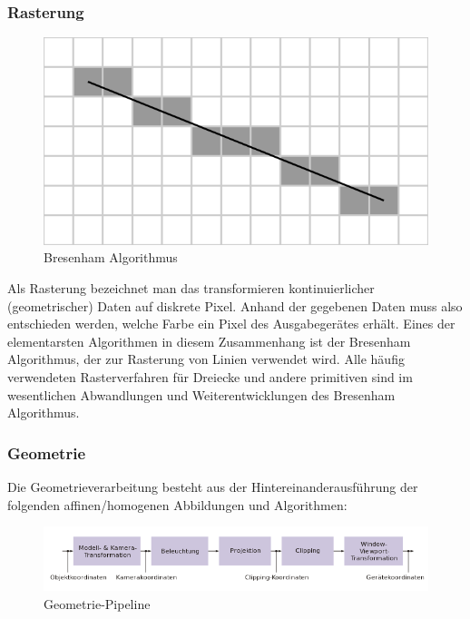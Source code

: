 \subsubsection{Rasterung}
\begin{figure}[H]
    \centering
    \includegraphics[width=1.0\textwidth]{images/bresenham.png}
    \caption{Bresenham Algorithmus}
    \label{fig:gimbal+lock}
\end{figure}
Als Rasterung bezeichnet man das transformieren kontinuierlicher (geometrischer) Daten auf diskrete Pixel.
Anhand der gegebenen Daten muss also entschieden werden, welche Farbe ein Pixel des Ausgabegerätes erhält.
Eines der elementarsten Algorithmen in diesem Zusammenhang ist der Bresenham Algorithmus, der zur Rasterung von Linien verwendet wird. Alle häufig verwendeten Rasterverfahren für Dreiecke und andere primitiven sind im wesentlichen Abwandlungen und Weiterentwicklungen  des Bresenham Algorithmus.

\subsubsection{Geometrie}
Die Geometrieverarbeitung   besteht aus der Hintereinanderausführung der folgenden affinen/homogenen Abbildungen und Algorithmen:
\begin{figure}[H]
    \centering
    \includegraphics[width=1.0\textwidth]{images/cgpipeline.png}
    \caption{Geometrie-Pipeline}
    \label{fig:gimbal+lock}
\end{figure}

\begin{Definition}[z-Buffer]
\end{Definition}


